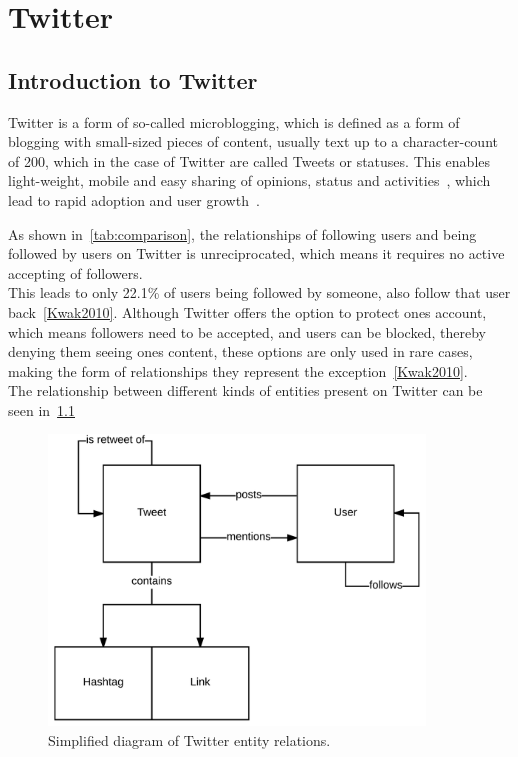 \chapter{Twitter}
\label{ch:twitter}

\section{Introduction to Twitter}
\label{sec:twitter}

Twitter is a form of so-called microblogging, which is defined as a form of blogging with small-sized pieces of content,
usually text up to a character-count of 200, which in the case of Twitter are called Tweets or statuses.
This enables light-weight, mobile and easy sharing of opinions, status and activities~\cite{Finin2007},
which lead to rapid adoption and user growth~\cite{mcgiboney2009twitter}.
\par
As shown in~\ref{tab:comparison}, the relationships of following users and being followed by users on Twitter is unreciprocated,
which means it requires no active accepting of followers.\\
This leads to only 22.1\% of users being followed by someone, also follow that user back~\ref{Kwak2010}.
Although Twitter offers the option to protect ones account, which means followers need to be accepted,
and users can be blocked, thereby denying them seeing ones content, these options are only used in rare cases,
making the form of relationships they represent the exception~\ref{Kwak2010}.\\
The relationship between different kinds of entities present on Twitter can be seen in~\ref{fig:twitter}
\par

\begin{figure}
    \centering
    \caption{Simplified diagram of Twitter entity relations.}
    \label{fig:twitter}
    \includegraphics[width=10cm]{../figures/twitter_er.pdf}
\end{figure}

